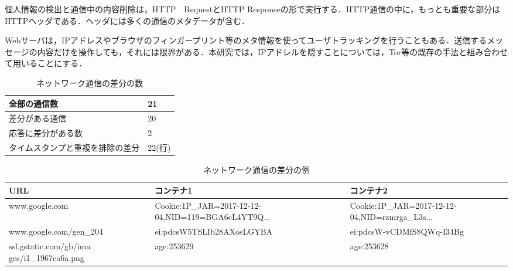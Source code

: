 \documentclass[submit,techrep]{ipsj}
\begin{document}
\begin{itemize}
\begin{itemize}
\end{itemize}

個人情報の検出と通信中の内容削除は，HTTP　RequestとHTTP Responseの形で実行する．HTTP通信の中に，もっとも重要な部分はHTTPヘッダである．ヘッダには多くの通信のメタデータが含む．

Webサーバは，IPアドレスやブラウザのフィンガープリント等のメタ情報を使ってユーザトラッキングを行うこともある．送信するメッセージの内容だけを操作しても，それには限界がある．本研究では，IPアドレルを隠すことについては，Tor等の既存の手法と組み合わせて用いることにする．








\begin{table}[ht]
\caption{ネットワーク通信の差分の数}
\centering

\begin{tabular}{ |p{5cm}|p{5cm}| }

 \hline
 全部の通信数　&\footnotesize{21}\\
 \hline
  \footnotesize{差分がある通信} & \footnotesize{20}\\
\hline

  \footnotesize{応答に差分がある数} & \footnotesize{2}\\
 \hline
\footnotesize{タイムスタンプと重複を排除の差分} & \footnotesize{22(行)}\\
\hline
\end{tabular}
\label{fig:netdiff}
\end{table}


 
 


\begin{table}[ht]
\caption{ネットワーク通信の差分の例}
\centering

\begin{tabular}{ |p{3.5cm}|p{5cm}|p{5cm}| }

 \hline
 URL　&コンテナ1　&\footnotesize{コンテナ2}\\
 \hline
 \footnotesize{www.google.com} & \footnotesize{Cookie:1P\_JAR=2017-12-12-04,NID=119=BGA6eL4YT9Q...} & \footnotesize{Cookie:1P\_JAR=2017-12-12-04,NID=rzmrga\_L3s...}\\
\hline
 \footnotesize{www.google.com/gen\_204} & \footnotesize{ei:pdcsW5TSLIb28AXosLGYBA} & \footnotesize{ei:pdcsW-vCDMfS8QWq-I34Bg}\\
\hline
 \footnotesize{ssl.gstatic.com/gb/ima ges/i1\_1967ca6a.png} & \footnotesize{age:253629} & \footnotesize{age:253628}\\
 \hline


\end{tabular}
\end{table}
\end{itemize}
\end{document}
